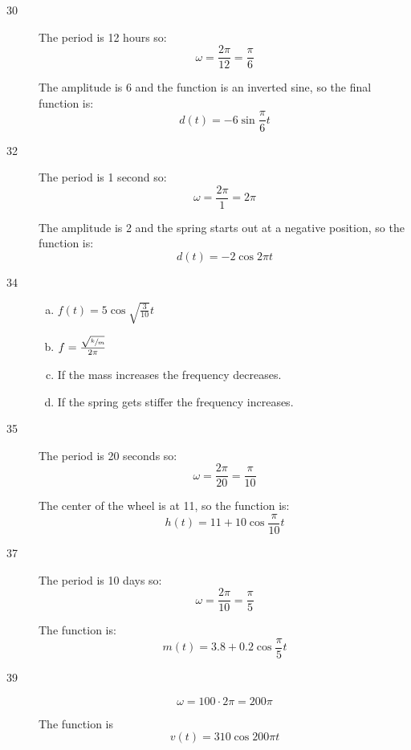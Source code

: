 \documentclass{exam}
\begin{document}
\begin{description}
      \item[30] The period is 12 hours so: 
        \[
          \omega = \frac{2 \pi}{12} = \frac{\pi}{6}
        \]

        The amplitude is 6 and the function is an inverted sine, so the final function is:
        \[
          \boxed{ d(t) = -6 \sin \frac{\pi}{6} t }
        \]

      \item[32] The period is 1 second so: 
        \[
          \omega = \frac{2 \pi}{1} = 2 \pi
        \]

        The amplitude is 2 and the spring starts out at a negative position, so the function is:
        \[
          \boxed{ d(t) = -2 \cos 2 \pi t }
        \]

      \item[34]
        \begin{enumerate}[(a)]
          \item $f(t) = 5 \cos \sqrt{\frac{3}{10}} t$

          \item $f = \frac{ \sqrt{\sfrac{k}{m}} }{2 \pi}$

          \item If the mass increases the frequency decreases.

          \item If the spring gets stiffer the frequency increases.

        \end{enumerate}

      \item[35] The period is 20 seconds so: 
        \[
          \omega = \frac{2 \pi}{20} = \frac{\pi}{10}
        \]

        The center of the wheel is at 11, so the function is:
        \[
          \boxed{ h(t) = 11 + 10 \cos \frac{\pi}{10} t }
        \]

      \item[37] The period is 10 days so: 
        \[
          \omega = \frac{2 \pi}{10} = \frac{\pi}{5}
        \]

        The function is:
        \[
          \boxed{ m(t) = 3.8 + 0.2 \cos \frac{\pi}{5} t }
        \]

      \item[39]
        \[
          \omega = 100 \cdot 2 \pi = 200 \pi
        \]

        The function is
        \[
          \boxed{ v(t) = 310 \cos 200 \pi t }
        \]


\end{description}
\end{document}
